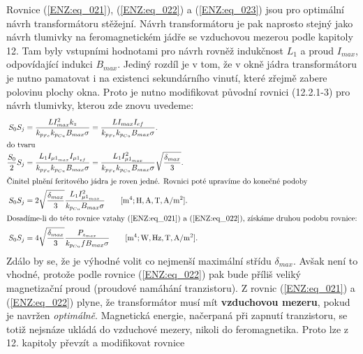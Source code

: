     Rovnice (\ref{ENZ:eq_021}), (\ref{ENZ:eq_022}) a (\ref{ENZ:eq_023}) jsou pro optimální návrh 
    transformátoru stěžejní. Návrh transformátoru je pak naprosto stejný jako návrh tlumivky 
    na feromagnetickém jádře se vzduchovou mezerou podle kapitoly 12. Tam byly vstupními 
    hodnotami pro návrh rovněž indukčnost \(L_1\) a proud \(I_{max}\), odpovídající indukci 
    \(B_{max}\). Jediný rozdíl je v tom, že v okně jádra transformátoru je nutno pamatovat i na 
    existenci sekundárního vinutí, které zřejmě zabere polovinu plochy okna. Proto je nutno 
    modifikovat původní rovnici (12.2.1-3) pro návrh tlumivky, kterou zde znovu uvedeme:
    \begin{align}
      S_0S_j &= \frac{LI_{max}^2k_z}{k_{p_{Fe}}k_{p_{Cu}}B_{max}\sigma} 
             =  \frac{LI_{max}I_{ef}}{k_{p_{Fe}}k_{p_{Cu}}B_{max}\sigma}. \label{ENZ:eq_024}  \\
      \shortintertext{do tvaru}
      \frac{S_0}{2}S_j 
             &= \frac{L_1I_{{\mu1}_{max}}I_{{\mu1}_{ef}}}{k_{p_{Fe}}k_{p_{Cu}}B_{max}\sigma}
              = \frac{L_1I_{{\mu1}_{max}}^2}{k_{p_{Fe}}k_{p_{Cu}}B_{max}\sigma}
                \sqrt{\frac{\delta_{max}}{3}}.                           \label{ENZ:eq_025}  \\
      \shortintertext{Činitel plnění feritového jádra je roven jedné. Rovnici poté upravíme do 
                      konečné podoby}
      S_0S_j &=2\sqrt{\frac{\delta_{max}}{3}} 
                \frac{L_1I_{{\mu1}_{max}}^2}{k_{p_{Cu}}B_{max}\sigma}
                \qquad [\si{m^4};\si{H},\si{A},\si{T},\si{A\per\m^2}].   \label{ENZ:eq_026}  \\
      \shortintertext{Dosadíme-li do této rovnice vztahy (\ref{ENZ:eq_021}) a (\ref{ENZ:eq_022}), 
                      získáme druhou podobu rovnice:}
      S_0S_j &=4\sqrt{\frac{\delta_{max}}{3}} 
                \frac{P_{z_{max}}}{k_{p_{Cu}}fB_{max}\sigma}
                \qquad [\si{m^4};\si{W},\si{Hz},\si{T},\si{A\per\m^2}].  \label{ENZ:eq_027}
    \end{align}
    Zdálo by se, že je výhodné volit co nejmenší maximální střídu \(\delta_{max}\). Avšak není to 
    vhodné, protože podle rovnice (\ref{ENZ:eq_022}) pak bude příliš veliký magnetizační proud 
    (proudové namáhání tranzistoru). Z rovnic (\ref{ENZ:eq_021}) a (\ref{ENZ:eq_022}) plyne, že 
    transformátor musí mít \textbf{vzduchovou mezeru}, pokud je navržen \emph{optimálně}. 
    Magnetická energie, načerpaná při zapnutí tranzistoru, se totiž nejsnáze ukládá do vzduchové 
    mezery, nikoli do feromagnetika. Proto lze z 12. kapitoly převzít a modifikovat rovnice 
